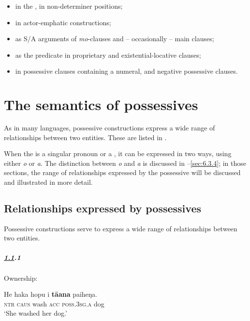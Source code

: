 \begin{itemize}
\item 
in the , in non-determiner positions;

\item 
in actor-emphatic constructions;

\item 
as S/A arguments of \textit{mo}{}-clauses and – occasionally – main clauses;

\item 
as the predicate in proprietary and existential-locative clauses;

\item 
in possessive clauses containing a numeral, and negative possessive clauses.

\end{itemize}
\section{The semantics of possessives}\label{sec:6.3}

As in many languages, possessive constructions express a wide range of relationships between two entities. These are listed in .

When the  is a singular pronoun or a , it can be expressed in two ways, using either \textit{o} or \textit{a}. The distinction between \textit{o} and \textit{a} is discussed in –\ref{sec:6.3.4}; in those sections, the range of relationships expressed by the possessive will be discussed and illustrated in more detail. 

\subsection{Relationships expressed by possessives}\label{sec:6.3.1}

Possessive constructions serve to express a wide range of relationships between two entities.

\subparagraph{\ref{sec:6.3.1}.1} Ownership:

\ea\label{ex:6.35}
\gll He haka hopu i \textbf{tā{\ꞌ}ana} paiheŋa.\\
\textsc{ntr} \textsc{caus} wash \textsc{acc} \textsc{poss.3sg.a} dog\\

\glt 
‘She washed her dog.’ \textstyleExampleref{[R168.012]} 
\z


